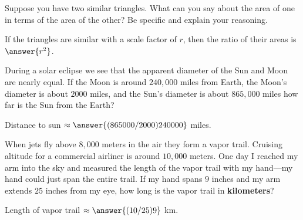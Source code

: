 \documentclass[nooutcomes]{ximera}
\begin{document}
\begin{question}
Suppose you have two similar triangles. What can you say about
  the area of one in terms of the area of the other? Be specific and
  explain your reasoning.
\begin{freeResponse}
\end{freeResponse}
\begin{hint}
If the triangles are similar with a scale factor of $r$, then the ratio of their areas is $\answer{r^2}$. 
\end{hint}
\end{question}

\begin{question}
During a solar eclipse we see that the apparent diameter of the
  Sun and Moon are nearly equal. If the Moon is around $240,000$ miles
  from Earth, the Moon's diameter is about $2000$ miles, and the Sun's
  diameter is about $865,000$ miles how far is the Sun from the Earth?

Distance to sun $\approx \answer{(865000/2000)240000}$ miles. 
\end{question}

\begin{question}
When jets fly above $8,000$ meters in the air they form a vapor
  trail. Cruising altitude for a commercial airliner is around $10,000$
  meters. One day I reached my arm into the sky and measured the
  length of the vapor trail with my hand---my hand could just span the
  entire trail. If my hand spans $9$ inches and my arm extends $25$
  inches from my eye, how long is the vapor trail in \textbf{kilometers}? 

Length of vapor trail $\approx \answer{(10/25)9}$ km. 
\end{question}
\end{document}
